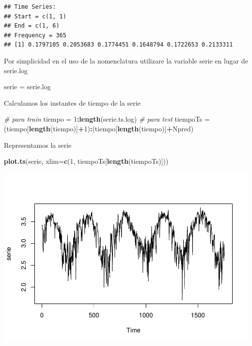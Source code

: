 \documentclass[]{article}
\newenvironment{Shaded}{\begin{snugshade}}{\end{snugshade}}
\newcommand{\KeywordTok}[1]{\textcolor[rgb]{0.13,0.29,0.53}{\textbf{#1}}}
\newcommand{\DataTypeTok}[1]{\textcolor[rgb]{0.13,0.29,0.53}{#1}}
\newcommand{\DecValTok}[1]{\textcolor[rgb]{0.00,0.00,0.81}{#1}}
\newcommand{\StringTok}[1]{\textcolor[rgb]{0.31,0.60,0.02}{#1}}
\newcommand{\CommentTok}[1]{\textcolor[rgb]{0.56,0.35,0.01}{\textit{#1}}}
\newcommand{\OperatorTok}[1]{\textcolor[rgb]{0.81,0.36,0.00}{\textbf{#1}}}
\newcommand{\NormalTok}[1]{#1}
\begin{document}
\begin{verbatim}
## Time Series:
## Start = c(1, 1) 
## End = c(1, 6) 
## Frequency = 365 
## [1] 0.1797105 0.2053683 0.1774451 0.1648794 0.1722653 0.2133311
\end{verbatim}

Por simplicidad en el uso de la nomenclatura utilizare la variable serie
en lugar de serie.log

\begin{Shaded}
\begin{Highlighting}[]
\NormalTok{serie =}\StringTok{ }\NormalTok{serie.log}
\end{Highlighting}
\end{Shaded}

Calculamos los instantes de tiempo de la serie

\begin{Shaded}
\begin{Highlighting}[]
\CommentTok{# para train}
\NormalTok{tiempo =}\StringTok{ }\DecValTok{1}\OperatorTok{:}\KeywordTok{length}\NormalTok{(serie.ts.log)}
\CommentTok{# para test}
\NormalTok{tiempoTs =}\StringTok{ }\NormalTok{(tiempo[}\KeywordTok{length}\NormalTok{(tiempo)]}\OperatorTok{+}\DecValTok{1}\NormalTok{)}\OperatorTok{:}\NormalTok{(tiempo[}\KeywordTok{length}\NormalTok{(tiempo)]}\OperatorTok{+}\NormalTok{Npred)}
\end{Highlighting}
\end{Shaded}

Representamos la serie

\begin{Shaded}
\begin{Highlighting}[]
\KeywordTok{plot.ts}\NormalTok{(serie, }\DataTypeTok{xlim=}\KeywordTok{c}\NormalTok{(}\DecValTok{1}\NormalTok{, tiempoTs[}\KeywordTok{length}\NormalTok{(tiempoTs)]))}
\end{Highlighting}
\end{Shaded}

\includegraphics{exercise2_files/figure-latex/unnamed-chunk-10-1.pdf}
\end{document}
